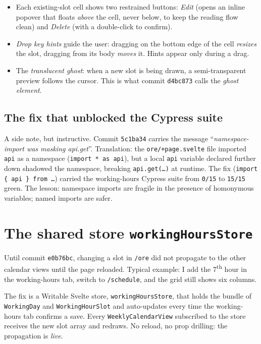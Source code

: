 \begin{itemize}
  \item Each existing-slot cell shows two restrained buttons:
    \emph{Edit} (opens an inline popover that floats
    \emph{above} the cell, never below, to keep the reading
    flow clean) and \emph{Delete} (with a double-click to
    confirm).
  \item \emph{Drop key hints} guide the user: dragging on the
    bottom edge of the cell \emph{resizes} the slot, dragging
    from its body \emph{moves} it. Hints appear only during a
    drag.
  \item The \emph{translucent ghost}: when a new slot is being
    drawn, a semi-transparent preview follows the cursor.
    This is what commit \texttt{d4bc873} calls the
    \emph{ghost element}.
\end{itemize}

\subsection{The fix that unblocked the Cypress suite}

A side note, but instructive. Commit \texttt{5c1ba34} carries
the message ``\emph{namespace-import was masking api.get}''.
Translation: the \texttt{ore/+page.svelte} file imported
\texttt{api} as a namespace (\texttt{import * as api}), but a
local \texttt{api} variable declared further down shadowed the
namespace, breaking \texttt{api.get(\dots)} at runtime. The fix
(\texttt{import \{ api \} from \dots}) carried the working-hours
Cypress suite from \texttt{0/15} to \texttt{15/15} green. The
lesson: namespace imports are fragile in the presence of
homonymous variables; named imports are safer.

\section{The shared store \texttt{workingHoursStore}}
\label{sec:store-en}

Until commit \texttt{e0b76bc}, changing a slot in \texttt{/ore}
did not propagate to the other calendar views until the page
reloaded. Typical example: I add the 7\textsuperscript{th}
hour in the working-hours tab, switch to \texttt{/schedule},
and the grid still shows six columns.

The fix is a Writable Svelte store, \texttt{workingHoursStore},
that holds the bundle of \texttt{WorkingDay} and
\texttt{WorkingHourSlot} and auto-updates every time the
working-hours tab confirms a save. Every
\texttt{WeeklyCalendarView} subscribed to the store receives
the new slot array and redraws. No reload, no prop drilling: the
propagation is \emph{live}.

